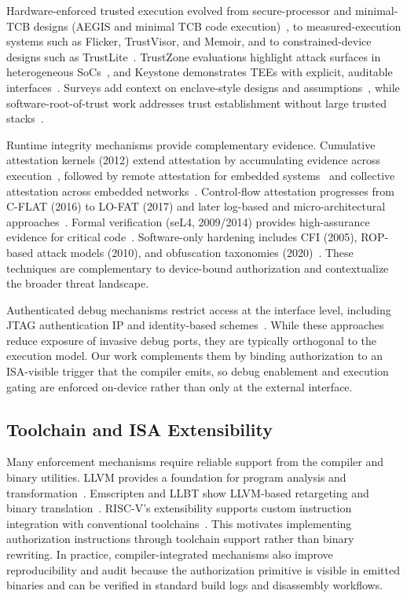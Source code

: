 Hardware-enforced trusted execution evolved from secure-processor and minimal-TCB
designs (AEGIS and minimal TCB code execution)~\cite{suh2005aegis,mccune2007minimaltcb},
to measured-execution systems such as Flicker, TrustVisor, and Memoir, and to
constrained-device designs such as TrustLite~\cite{mccune2008flicker,mccune2010trustvisor,parno2011memoir,koeberl2014trustlite}.
TrustZone evaluations highlight attack surfaces in heterogeneous
SoCs~\cite{zhang2017trustzoneeval}, and Keystone demonstrates TEEs with explicit,
auditable interfaces~\cite{lee2020keystone}. Surveys add context on enclave-style
designs and assumptions~\cite{costan2017secureprocessors,ahmed2025riscvtee}, while
software-root-of-trust work addresses trust establishment without large trusted
stacks~\cite{gligor2019establishing}.

Runtime integrity mechanisms provide complementary evidence. Cumulative attestation
kernels (2012) extend attestation by accumulating evidence across
execution~\cite{lemay2012cumulative}, followed by remote attestation for embedded
systems~\cite{kylanpaa2016remoteattest} and collective attestation across embedded
networks~\cite{ibrahim2018collectiveatt}. Control-flow attestation progresses from
C-FLAT (2016) to LO-FAT (2017) and later log-based and micro-architectural
approaches~\cite{abera2016cflat,dessouky2017lofat,liu2019logbasedcfa,benyehuda2022nanovised}.
Formal verification (seL4, 2009/2014) provides high-assurance evidence for critical
code~\cite{klein2009sel4,klein2014tocs}. Software-only hardening includes CFI (2005),
ROP-based attack models (2010), and obfuscation taxonomies
(2020)~\cite{abadi2005cfi,checkoway2010rop,tran2020layered}. These techniques are
complementary to device-bound authorization and contextualize the broader threat
landscape.

Authenticated debug mechanisms restrict access at the interface level, including JTAG
authentication IP and identity-based schemes~\cite{lapeyre2022jtagauth,wang2020schnorrjtag}.
While these approaches reduce exposure of invasive debug ports, they are typically
orthogonal to the execution model. Our work complements them by binding authorization
to an ISA-visible trigger that the compiler emits, so debug enablement and execution
gating are enforced on-device rather than only at the external interface.

\subsection{Toolchain and ISA Extensibility}
Many enforcement mechanisms require reliable support from the compiler and binary
utilities. LLVM provides a foundation for program analysis and
transformation~\cite{lattner2004llvm}. Emscripten and LLBT show LLVM-based retargeting
and binary translation~\cite{zakai2011emscripten,shen2012llbt}. RISC-V’s extensibility
supports custom instruction integration with conventional
toolchains~\cite{waterman2014riscv}. This motivates implementing authorization
instructions through toolchain support rather than binary rewriting.
In practice, compiler-integrated mechanisms also improve reproducibility and audit
because the authorization primitive is visible in emitted binaries and can be verified
in standard build logs and disassembly workflows.

